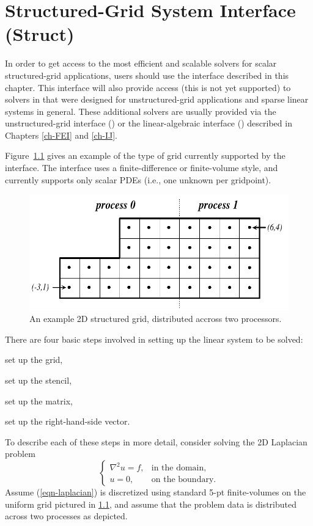 
\chapter{Structured-Grid System Interface (Struct)}
\label{ch-Struct}

In order to get access to the most efficient and scalable solvers for
scalar structured-grid applications, users should use the
 interface described in this chapter.  This interface
will also provide access (this is not yet supported) to solvers in
\hypre{} that were designed for unstructured-grid applications and
sparse linear systems in general.  These additional solvers are
usually provided via the unstructured-grid interface () or
the linear-algebraic interface () described in Chapters
\ref{ch-FEI} and \ref{ch-IJ}.

Figure~\ref{fig-struct-example} gives an example of the type of grid
currently supported by the  interface.  The interface
uses a finite-difference or finite-volume style, and currently
supports only scalar PDEs (i.e., one unknown per gridpoint).
\begin{figure}
\centering
\includegraphics[width=.5\textwidth]{figStructExample1}
\caption{%
An example 2D structured grid, distributed accross two processors.}
\label{fig-struct-example}
\end{figure}
There are four basic steps involved in setting up the linear system
to be solved:
\begin{list}{.}{\setlength{\itemsep}{0in}}
\item set up the grid,
\item set up the stencil,
\item set up the matrix,
\item set up the right-hand-side vector.
\end{list}
To describe each of these steps in more detail, consider solving the
2D Laplacian problem
\begin{equation}\label{eqn-laplacian}
\left \{
\begin{array}{ll}
\nabla^2 u = f , & \mbox{in the domain}, \\
u = 0,           & \mbox{on the boundary}.
\end{array}
\right .
\end{equation}
Assume (\ref{eqn-laplacian}) is discretized using standard 5-pt finite-volumes
on the uniform grid pictured in \ref{fig-struct-example}, and assume that the
problem data is distributed across two processes as depicted.

